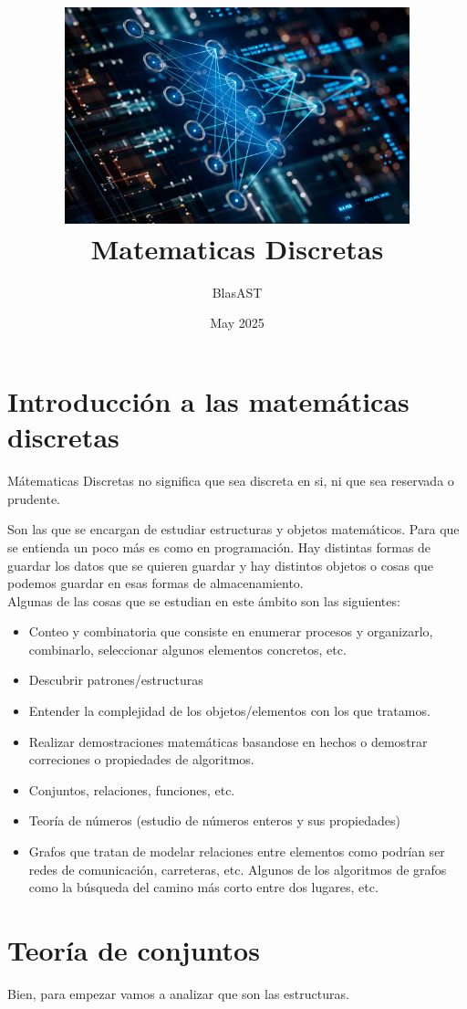 \documentclass{article}
\title{
    \includegraphics[width=10cm]{imgs/portada.jpg}
    \textbf{Matematicas Discretas}
}
\author{BlasAST}
\date{May 2025}
\begin{document}
\maketitle

\newpage

\tableofcontents

\newpage

\section{Introducción a las matemáticas discretas}
Mátematicas Discretas no significa que sea discreta en si, ni que sea reservada o prudente.

Son las que se encargan de estudiar estructuras y objetos matemáticos.
Para que se entienda un poco más es como en programación.
Hay distintas formas de guardar los datos que se
quieren guardar y hay distintos objetos o cosas que podemos guardar en esas formas de almacenamiento.\\

Algunas de las cosas que se estudian en este ámbito son las siguientes:

\begin{itemize}
    \item Conteo y combinatoria que consiste en enumerar procesos y organizarlo,
    combinarlo, seleccionar algunos elementos concretos, etc.
    \item Descubrir patrones/estructuras
    \item Entender la complejidad de los objetos/elementos con los que tratamos.
    \item Realizar demostraciones matemáticas basandose en hechos o demostrar correciones
    o propiedades de algoritmos.
    \item Conjuntos, relaciones, funciones, etc.
    \item Teoría de números (estudio de números enteros y sus propiedades)
    \item Grafos que tratan de modelar relaciones entre elementos como podrían ser
    redes de comunicación, carreteras, etc. Algunos de los algoritmos de grafos
    como la búsqueda del camino más corto entre dos lugares, etc.
\end{itemize}
\newpage
\section{Teoría de conjuntos}
Bien, para empezar vamos a analizar que son las estructuras.\\
\end{document}
